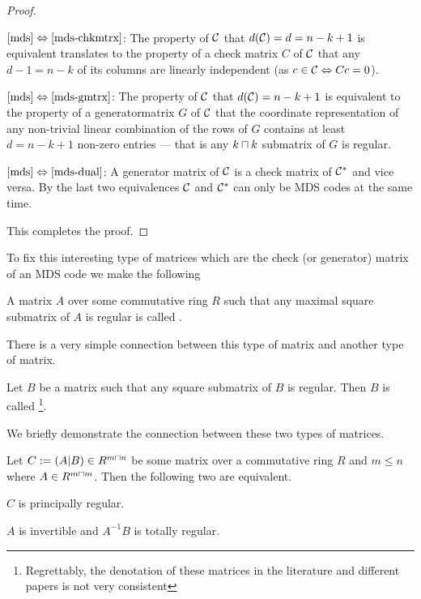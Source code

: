 \begin{proof}
    \begin{implications}
            \item[$\autoref{mds}\equival\autoref{mds-chkmtrx}$:]
        The property of $\mathcal{C}$ that $d(\mathcal{C})=d=n-k+1$ is equivalent translates to the property of a check matrix $C$ of $\mathcal{C}$ that any $d-1=n-k$ of its columns are linearly independent (as $c\in\mathcal{C}\Leftrightarrow Cc=0$).
            \item[$\autoref{mds}\equival\autoref{mds-gmtrx}$:]
        The property of $\mathcal{C}$ that $d(\mathcal{C})=n-k+1$ is equivalent to the property of a generatormatrix $G$ of $\mathcal{C}$ that the coordinate representation of any non-trivial linear combination of the rows of $G$ contains at least $d=n-k+1$ non-zero entries --- that is any $k\settimes k$ submatrix of $G$ is regular.
            \item[$\autoref{mds}\equival\autoref{mds-dual}$:]
        A generator matrix of $\mathcal{C}$ is a check matrix of $\mathcal{C}^{\ast}$ and vice versa. By the last two equivalences $\mathcal{C}$ and $\mathcal{C}^{\ast}$ can only be MDS codes at the same time. 
    \end{implications}
This completes the proof.
\end{proof}

To fix this interesting type of matrices which are the check (or generator) matrix of an MDS code we make the following

\begin{definition}
    A matrix $A$ over some commutative ring $R$ such that any maximal square submatrix of $A$ is regular is called .
\end{definition}

There is a very simple connection between this type of matrix and another type of matrix.

\begin{definition}
    Let $B$ be a matrix such that any square submatrix of $B$ is regular. Then $B$ is called \footnote{Regrettably, the denotation of these matrices in the literature and different papers is not very consistent}. 
\end{definition}

We briefly demonstrate the connection between these two types of matrices.

\begin{lemma}
    Let $C:=(A|B)\in R^{m\settimes n}$ be some matrix over a commutative ring $R$ and $m\leq n$ where $A\in R^{m\settimes m}$.
    Then the following two are equivalent.
    \begin{statements}
            \item $C$ is principally regular.
            \item $A$ is invertible and $A^{-1}B$ is totally regular.
    \end{statements}
\end{lemma}

